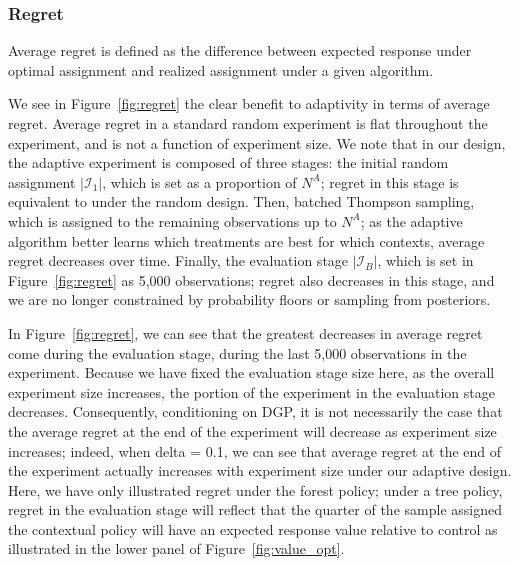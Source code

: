 \documentclass[letterpaper, 12pt, parskip=full,DIV=10]{scrartcl}
\begin{document}
\subsubsection{Regret}
Average regret is defined as the difference between expected response under optimal assignment and realized assignment under a given algorithm. 

We see in Figure~\ref{fig:regret} the clear benefit to adaptivity in terms of average regret. Average regret in a standard random experiment is flat throughout the experiment, and is not a function of experiment size. We note that in our design, the adaptive experiment is composed of three stages: the initial random assignment $|\mathcal{I}_1|$, which is set as a proportion of $N^A$; regret in this stage is equivalent to under the random design. Then, batched Thompson sampling, which is assigned to the remaining observations up to $N^A$; as the adaptive algorithm better learns which treatments are best for which contexts, average regret decreases over time. Finally, the evaluation stage $|\mathcal{I}_B|$, which is set in Figure~\ref{fig:regret} as 5,000 observations; regret also decreases in this stage, and we are no longer constrained by probability floors or sampling from posteriors. 

In Figure~\ref{fig:regret}, we can see that the greatest decreases in average regret come during the evaluation stage, during the last 5,000 observations in the experiment. Because we have fixed the evaluation stage size here, as the overall experiment size increases, the portion of the experiment in the evaluation stage decreases. Consequently, conditioning on DGP, it is not necessarily the case that the average regret at the end of the experiment will decrease as experiment size increases; indeed, when delta = 0.1, we can see that average regret at the end of the experiment actually increases with experiment size under our adaptive design. Here, we have only illustrated regret under the forest policy; under a tree policy, regret in the evaluation stage will reflect that the quarter of the sample assigned the contextual policy will have an expected response value relative to control as illustrated in the lower panel of Figure~\ref{fig:value_opt}. 
\end{document}
